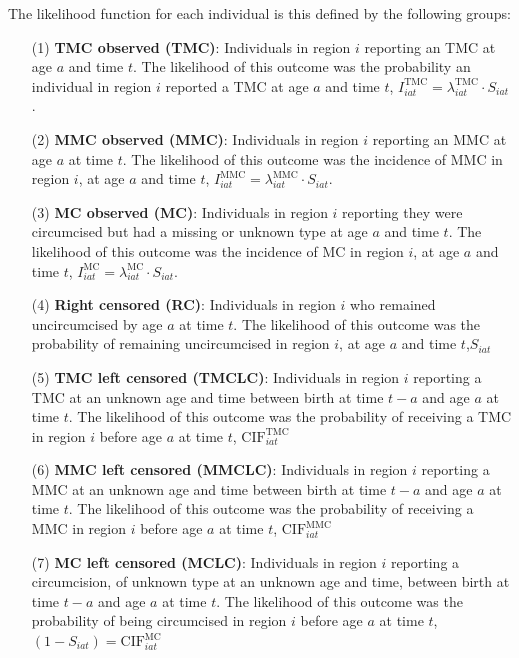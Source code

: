 \documentclass{article}
\begin{document}
\begin{appendix}
\noindent The likelihood function for each individual is this defined by the following groups:
\begin{itemize}
	\item[(1)] \textbf{TMC observed (TMC)}: Individuals in region $i$ reporting an TMC at age $a$ and time $t$. The likelihood of this outcome was the probability an individual in region $i$ reported a TMC at age $a$ and time $t$, $I^{\text{TMC}}_{iat} = \lambda^{\text{TMC}}_{iat}\cdot S_{iat}$. 
	\item[(2)] \textbf{MMC observed (MMC)}: Individuals in region $i$ reporting an MMC at age $a$ at time $t$. The likelihood of this outcome was the incidence of MMC in region $i$, at age $a$ and time $t$, $I^{\text{MMC}}_{iat} = \lambda^{\text{MMC}}_{iat}\cdot S_{iat}$. 
	\item[(3)] \textbf{MC observed (MC)}: Individuals in region $i$ reporting they were circumcised but had a missing or unknown type at age $a$ and time $t$. The likelihood of this outcome was the incidence of MC in region $i$, at age $a$ and time $t$, $I^{\text{MC}}_{iat} = \lambda^{\text{MC}}_{iat}\cdot S_{iat}$. 
	\item[(4)] \textbf{Right censored (RC)}: Individuals in region $i$ who remained uncircumcised by age $a$ at time $t$. The likelihood of this outcome was the probability of remaining uncircumcised in region $i$, at age $a$ and time $t$,$S_{iat}$
	\item[(5)] \textbf{TMC left censored (TMCLC)}: Individuals in region $i$ reporting a TMC at an unknown age and time between birth at time $t-a$ and age $a$ at time $t$. The likelihood of this outcome was the probability of receiving a TMC in region $i$ before age $a$ at time $t$, $\text{CIF}^{\text{TMC}}_{iat}$
	\item[(6)] \textbf{MMC left censored (MMCLC)}: Individuals in region $i$ reporting a MMC at an unknown age and time between birth at time $t-a$ and age $a$ at time $t$. The likelihood of this outcome was the probability of receiving a MMC in region $i$ before age $a$ at time $t$, $\text{CIF}^{\text{MMC}}_{iat}$ 
	\item[(7)] \textbf{MC left censored (MCLC)}: Individuals in region $i$ reporting a circumcision, of unknown type at an unknown age and time, between birth at time $t-a$ and age $a$ at time $t$. The likelihood of this outcome was the probability of being circumcised in region $i$ before age $a$ at time $t$, $(1-S_{iat}) = \text{CIF}^{\text{MC}}_{iat}$ 
\end{itemize}


\end{appendix}
\end{document}
